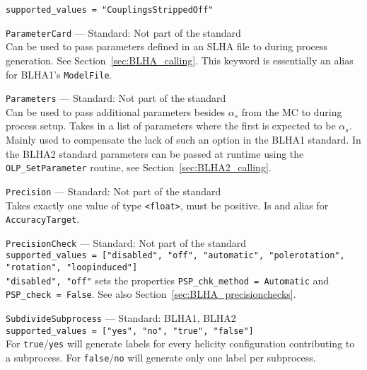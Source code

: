 \begin{basedescript}{\desclabelstyle{\pushlabel}}
        \lstinline[style=in]|supported_values = "CouplingsStrippedOff"|
     \item[\hspace{-1em}]\colorbox{gray!30}{\lstinline[style=in]|ParameterCard|} --- Standard: Not part of the standard\vspace{0.1cm}\\
        Can be used to pass parameters defined in an SLHA file to \gosam during process generation. See Section~\ref{sec:BLHA_calling}. This keyword is essentially an alias for BLHA1's \lstinline[style=in]|ModelFile|.
    \item[\hspace{-1em}]\colorbox{gray!30}{\lstinline[style=in]|Parameters|} --- Standard: Not part of the standard\vspace{0.1cm}\\
        Can be used to pass additional parameters besides $\alpha_s$ from the MC to \gosam during process setup. Takes in a list of parameters where the first is expected to be $\alpha_s$. Mainly used to compensate the lack of such an option in the BLHA1 standard. In the BLHA2 standard parameters can be passed at runtime using the \texttt{OLP\_SetParameter} routine, see Section~\ref{sec:BLHA2_calling}.
    \item[\hspace{-1em}]\colorbox{gray!30}{\lstinline[style=in]|Precision|} --- Standard: Not part of the standard\vspace{0.1cm}\\
        Takes exactly one value of type \texttt{<float>}, must be positive. Is and alias for \texttt{AccuracyTarget}.
    \item[\hspace{-1em}]\colorbox{gray!30}{\lstinline[style=in]|PrecisionCheck|} --- Standard: Not part of the standard\vspace{0.1cm}\\
        \lstinline[style=in]|supported_values = ["disabled", "off", "automatic", "polerotation", "rotation", "loopinduced"]|\\
        \lstinline[style=in]|"disabled", "off"| sets the properties \lstinline[style=in]|PSP_chk_method = Automatic| and  \lstinline[style=in]|PSP_check = False|. See also Section~\ref{sec:BLHA_precisionchecks}.
    \item[\hspace{-1em}]\colorbox{gray!30}{\lstinline[style=in]|SubdivideSubprocess|} --- Standard: BLHA1, BLHA2\vspace{0.1cm}\\
        \lstinline[style=in]|supported_values = ["yes", "no", "true", "false"]|\\
        For \texttt{true}/\texttt{yes} \gosam will generate labels for every helicity configuration contributing to a subprocess. For \texttt{false}/\texttt{no} \gosam will generate only one label per subprocess.
\end{basedescript}

